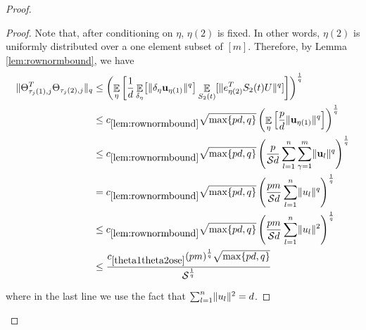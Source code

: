 \documentclass[11pt]{amsart}
\numberwithin{equation}{section}
\numberwithin{equation}{section}
\DeclareMathOperator{\E}{\mathbb{E}}
\newcommand{\cS}{\mathcal{S}}
\DeclarePairedDelimiter{\norm}{\lVert}{\rVert}
\DeclarePairedDelimiter{\sqbr}{[}{]}
\theoremstyle{remark}
\theoremstyle{definition}
\begin{document}
\begin{proof}
\begin{proof}
Note that, after conditioning on $\eta$, $\eta(2)$ is fixed. In other words, $\eta(2)$ is uniformly distributed over a one element subset of $[m]$. Therefore, by Lemma \ref{lem:rownormbound}, we have  
\begin{align*}
    \norm{\Theta_{\tau_j(1),j}^T\Theta_{\tau_j(2),j}}_{q} &\le \left( \E_{\eta} \left[ \frac{1}{d} \E_{\delta_{\eta}}\sqbr*{\norm{\delta_{\eta} \mathbf{u}_{\eta(1)} }^{q}} \E_{S_2(t)}[ \norm{e_{\eta(2)}^TS_2(t)U}^{q}] \right] \right)^\frac{1}{q} \\
    &\le c_{\ref*{lem:rownormbound}}\sqrt{\max \{ pd, q \}} \left( \E_{\eta} \left[ \frac{p}{d} \norm{ \mathbf{u}_{\eta(1)} }^{q} \right] \right)^\frac{1}{q} \\
    &\le c_{\ref*{lem:rownormbound}}\sqrt{\max \{ pd, q \}} \left( \frac{p}{\mathcal{S}d} \sum_{l=1}^n \sum_{\gamma=1}^{m}  \norm{\mathbf{u}_l}^{q} \right)^\frac{1}{q} \\
    &= c_{\ref*{lem:rownormbound}}\sqrt{\max \{ pd, q \}} \left( \frac{pm}{\cS  d} \sum_{l=1}^{n} \norm{u_l}^{q} \right)^\frac{1}{q} \\
    &\le c_{\ref*{lem:rownormbound}}\sqrt{\max \{ pd, q \}} \left( \frac{pm}{\cS  d} \sum_{l=1}^{n} \norm{u_l}^{2} \right)^\frac{1}{q} \\
    &\le \frac{c_{\ref*{theta1theta2ose}}(pm)^\frac{1}{q}\sqrt{\max \{ pd, q \}}}{\cS^\frac{1}{q}}
\end{align*}

where in the last line we use the fact that $\sum_{l=1}^{n} \norm{u_l}^{2} = d$.

\end{proof}


\end{proof}
\end{document}
